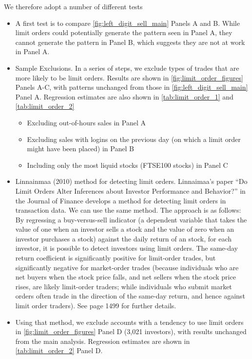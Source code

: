 We therefore adopt a number of different tests 
\begin{itemize}
	\item A first test is to compare \ref{fig:left_digit_sell_main} Panels A and B. While limit orders could potentially generate the pattern seen in Panel A, they cannot generate the pattern in Panel B, which suggests they are not at work in Panel A.
	\item Sample Exclusions. In a series of steps, we exclude types of trades that are more likely to be limit orders. Results are shown in \ref{fig:limit_order_figures} Panels A-C, with patterns unchanged from those in \ref{fig:left_digit_sell_main} Panel A. Regression estimates are also shown in \ref{tab:limit_order_1} and \ref{tab:limit_order_2}
	\begin{itemize}
		\item Excluding out-of-hours sales in Panel A
		\item Excluding sales with logins on the previous day (on which a limit order might have been placed) in Panel B
		\item Including only the most liquid stocks (FTSE100 stocks) in Panel C
	\end{itemize} 
	\item Linnainmaa (2010) method for detecting limit orders. Linnaimaa's paper ``Do Limit Orders Alter Inferences about Investor Performance and Behavior?'' in the Journal of Finance develops a method for detecting limit orders in transaction data. We can use the same method. The approach is as follows: By regressing a buy-versus-sell indicator (a dependent variable that takes the value of one when an investor sells a stock and the value of zero when an investor purchases a stock) against the daily return of an stock, for each investor, it is possible to detect investors using limit orders. The same-day return coefficient is significantly positive for limit-order trades, but significantly negative for market-order trades (because individuals who are net buyers when the stock price falls, and net sellers when the stock price rises, are likely limit-order traders; while individuals who submit market orders often trade in the direction of the same-day return, and hence against limit order traders). See page 1499 for further details.
	\item Using that method, we exclude accounts with a tendency to use limit orders in \ref{fig:limit_order_figures} Panel D (3,021 investors), with results unchanged from the main analysis. Regression estimates are shown in \ref{tab:limit_order_2} Panel D.
\end{itemize}

